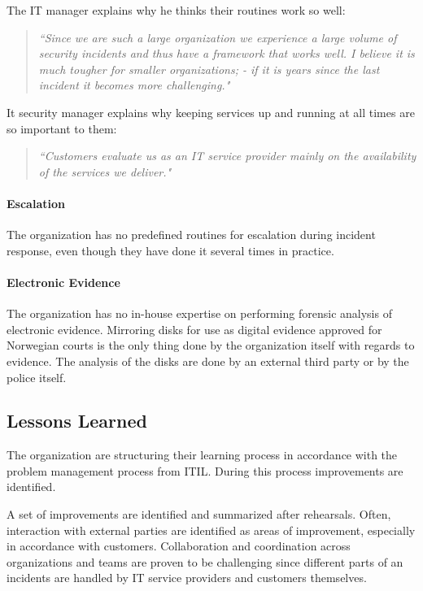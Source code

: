 The IT manager explains why he thinks their routines work so well:
\begin{quote}
\textit{``Since we are such a large organization we experience a large volume of security incidents and thus have a framework that works well. I believe it is much tougher for smaller organizations; - if it is years since the last incident it becomes more challenging."}
\end{quote}

It security manager explains why keeping services up and running at all times are so important to them:
\begin{quote}
\textit{``Customers evaluate us as an IT service provider mainly on the availability of the services we deliver."}
\end{quote}

\paragraph{Escalation}
The organization has no predefined routines for escalation during incident response, even though they have done it several times in practice.

\paragraph{Electronic Evidence}
The organization has no in-house expertise on performing forensic analysis of electronic evidence. Mirroring disks for use as digital evidence approved for Norwegian courts is the only thing done by the organization itself with regards to evidence. The analysis of the disks are done by an external third party or by the police itself.

\subsection{Lessons Learned}
The organization are structuring their learning process in accordance with the problem management process from ITIL. During this process improvements are identified. 

A set of improvements are identified and summarized after rehearsals. Often, interaction with external parties are identified as areas of improvement, especially in accordance with customers. Collaboration and coordination across organizations and teams are proven to be challenging since different parts of an incidents are handled by IT service providers and customers themselves. 

